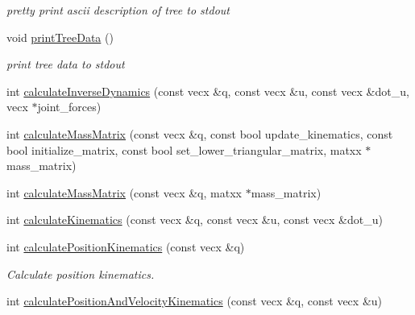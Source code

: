 \begin{CompactItemize}
\begin{CompactList}\small\item\em pretty print ascii description of tree to stdout \item\end{CompactList}\item 
\hypertarget{classbt_inverse_dynamics_1_1_multi_body_tree_f1b892a77455293f6fe3a0d1594f2548}{
void \hyperlink{classbt_inverse_dynamics_1_1_multi_body_tree_f1b892a77455293f6fe3a0d1594f2548}{printTreeData} ()}
\label{classbt_inverse_dynamics_1_1_multi_body_tree_f1b892a77455293f6fe3a0d1594f2548}

\begin{CompactList}\small\item\em print tree data to stdout \item\end{CompactList}\item 
int \hyperlink{classbt_inverse_dynamics_1_1_multi_body_tree_20e281422ee7504a25357275c08d5690}{calculateInverseDynamics} (const vecx \&q, const vecx \&u, const vecx \&dot\_\-u, vecx $\ast$joint\_\-forces)
\item 
int \hyperlink{classbt_inverse_dynamics_1_1_multi_body_tree_0a767d639bb90ad3b1cb529eb26baa75}{calculateMassMatrix} (const vecx \&q, const bool update\_\-kinematics, const bool initialize\_\-matrix, const bool set\_\-lower\_\-triangular\_\-matrix, matxx $\ast$mass\_\-matrix)
\item 
int \hyperlink{classbt_inverse_dynamics_1_1_multi_body_tree_07b710ad4cbbe4cdadd8e2b5ad7c854a}{calculateMassMatrix} (const vecx \&q, matxx $\ast$mass\_\-matrix)
\item 
int \hyperlink{classbt_inverse_dynamics_1_1_multi_body_tree_fa6df6ee25f28a4de404d82c6bbf78ff}{calculateKinematics} (const vecx \&q, const vecx \&u, const vecx \&dot\_\-u)
\item 
\hypertarget{classbt_inverse_dynamics_1_1_multi_body_tree_4bc4655645713c44425ce3bcb01d63ca}{
int \hyperlink{classbt_inverse_dynamics_1_1_multi_body_tree_4bc4655645713c44425ce3bcb01d63ca}{calculatePositionKinematics} (const vecx \&q)}
\label{classbt_inverse_dynamics_1_1_multi_body_tree_4bc4655645713c44425ce3bcb01d63ca}

\begin{CompactList}\small\item\em Calculate position kinematics. \item\end{CompactList}\item 
\hypertarget{classbt_inverse_dynamics_1_1_multi_body_tree_843255f7b29f4c65dc1201d122373a13}{
int \hyperlink{classbt_inverse_dynamics_1_1_multi_body_tree_843255f7b29f4c65dc1201d122373a13}{calculatePositionAndVelocityKinematics} (const vecx \&q, const vecx \&u)}
\label{classbt_inverse_dynamics_1_1_multi_body_tree_843255f7b29f4c65dc1201d122373a13}


\end{CompactItemize}
